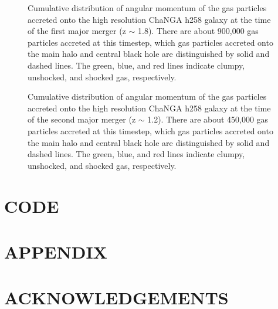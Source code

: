 \documentclass[12pt,headA,chapB]{fiskthesis}
\begin{document}
\begin{figure}
\centerline{}
\caption[ChaNGa h258 First Merger Angular Momentum Distribution]{ Cumulative distribution of angular momentum of the gas particles accreted onto the high resolution ChaNGA h258 galaxy at the time of the first major merger (z $\sim$ 1.8). There are about 900,000 gas particles accreted at this timestep, which gas particles accreted onto the main halo and central black hole are distinguished by solid and dashed lines. The green, blue, and red lines indicate clumpy, unshocked, and shocked gas, respectively.}
\label{hrh258angmom_merger1} 
\end{figure}

\begin{figure}
\centerline{}
\caption[ChaNGa h258 Second Merger Angular Momentum Distribution]{ Cumulative distribution of angular momentum of the gas particles accreted onto the high resolution ChaNGA h258 galaxy at the time of the second major merger (z $\sim$ 1.2). There are about 450,000 gas particles accreted at this timestep, which gas particles accreted onto the main halo and central black hole are distinguished by solid and dashed lines. The green, blue, and red lines indicate clumpy, unshocked, and shocked gas, respectively.}
\label{hrh258angmom_merger2} 
\end{figure}

\backmatter
\chapter{CODE}
\thispagestyle{empty}

\chapter{APPENDIX}
\thispagestyle{empty}

\chapter*{ACKNOWLEDGEMENTS}
\thispagestyle{empty}

\renewcommand{\thepage}{}\renewcommand{\thepage}{}

\end{document}
